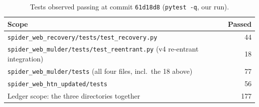\begin{table}[!htbp]
\centering
\caption{Tests observed passing at commit \texttt{61d18d8} (\texttt{pytest -q}, our run).}
\label{tab:recovery-tests}
\begin{tabular}{@{}lr@{}}
\toprule
Scope & Passed \\
\midrule
\texttt{spider\_web\_recovery/tests/test\_recovery.py} & 44 \\
\texttt{spider\_web\_mulder/tests/test\_reentrant.py} (v4 re-entrant integration) & 18 \\
\texttt{spider\_web\_mulder/tests} (all four files, incl.\ the 18 above) & 77 \\
\texttt{spider\_web\_htn\_updated/tests} & 56 \\
\midrule
Ledger scope: the three directories together & 177 \\
\bottomrule
\end{tabular}
\end{table}


